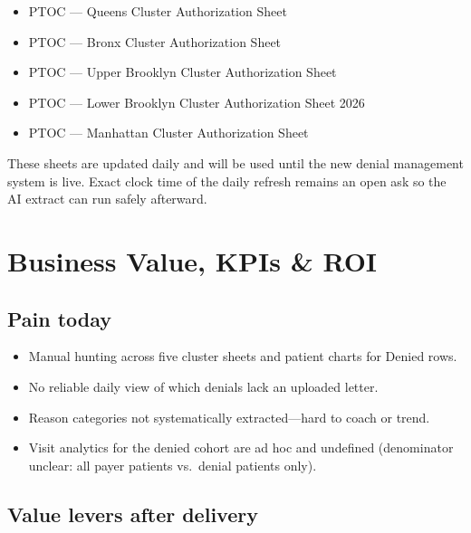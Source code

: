\documentclass[11pt,a4paper]{article}
\begin{document}
\begin{itemize}
  \item PTOC --- Queens Cluster Authorization Sheet
  \item PTOC --- Bronx Cluster Authorization Sheet
  \item PTOC --- Upper Brooklyn Cluster Authorization Sheet
  \item PTOC --- Lower Brooklyn Cluster Authorization Sheet 2026
  \item PTOC --- Manhattan Cluster Authorization Sheet
\end{itemize}

These sheets are updated daily and will be used until the new denial management system
is live. Exact clock time of the daily refresh remains an open ask so the AI extract can
run safely afterward.


\section{Business Value, KPIs \& ROI}

\subsection{Pain today}

\begin{itemize}
  \item Manual hunting across five cluster sheets and patient charts for Denied rows.
  \item No reliable daily view of which denials lack an uploaded letter.
  \item Reason categories not systematically extracted---hard to coach or trend.
  \item Visit analytics for the denied cohort are ad hoc and undefined
        (denominator unclear: all payer patients vs.\ denial patients only).
\end{itemize}

\subsection{Value levers after delivery}
\end{document}
